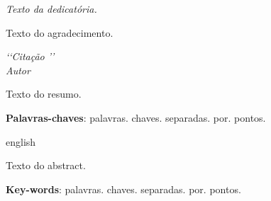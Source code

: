 \documentclass[12pt, openright, a4paper, brazil, english, french, spanish, bibjustif, openany, oneside]{abntex2}
\begin{document}

\begin{dedicatoria}
   \vspace*{\fill}
   \centering
   \noindent
    \textit{Texto da dedicatória.}\vspace*{\fill}
\end{dedicatoria}


\begin{agradecimentos}

Texto do agradecimento.

\end{agradecimentos}


\begin{epigrafe}
    \vspace*{\fill}
	\begin{flushright}
		\textit{\lq\lq Citação \rq\rq\\ Autor}
	\end{flushright}
\end{epigrafe}


\begin{resumo}

Texto do resumo.

 \vspace{\onelineskip}
    
 \noindent
 \textbf{Palavras-chaves}: palavras. chaves. separadas. por. pontos.
\end{resumo}


\begin{resumo}[Abstract]
 \begin{otherlanguage*}{english}

Texto do abstract.

  \vspace{\onelineskip}
 
   \noindent 
 \textbf{Key-words}: palavras. chaves. separadas. por. pontos.
 \end{otherlanguage*}
\end{resumo}



\listoffigures*
\cleardoublepage

\listoftables*
\cleardoublepage
\end{document}
